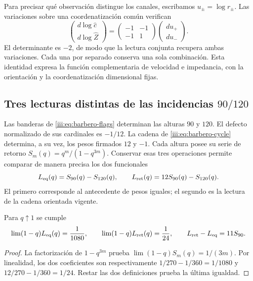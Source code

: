 Para precisar qué observación distingue los canales, escribamos
$u_\pm=\log r_\pm$. Las variaciones sobre una coordenatización común verifican
\begin{equation}
 \begin{pmatrix}d\log\widehat c\\d\log\widehat Z\end{pmatrix}
 =\begin{pmatrix}-1&-1\\-1&1\end{pmatrix}
 \begin{pmatrix}du_+\\du_-\end{pmatrix}.
 \label{iii:eq:rec27-variaciones}
\end{equation}
El determinante es $-2$, de modo que la lectura conjunta recupera
ambas variaciones. Cada una por separado conserva una sola combinación.
Esta identidad expresa la función complementaria de velocidad e
impedancia, con la orientación y la coordenatización dimensional fijas.

\subsection{Tres lecturas distintas de las incidencias $90/120$}

Las banderas de \eqref{iii:eq:barbero-flags} determinan las alturas
$90$ y $120$. El defecto normalizado de sus cardinales es $-1/12$.
La cadena de \eqref{iii:eq:barbero-cycle} determina, a su vez,
los pesos firmados $12$ y $-1$. Cada altura posee su serie de retorno
$S_m(q)=q^m/(1-q^{3m})$. Conservar esas tres operaciones permite
comparar de manera precisa los dos funcionales
\begin{equation}
 L_{\rm eq}(q)=S_{90}(q)-S_{120}(q),\qquad
 L_{\rm ret}(q)=12S_{90}(q)-S_{120}(q).
 \label{iii:eq:rec27-dos-kernels}
\end{equation}
El primero corresponde al antecedente de pesos iguales; el segundo es
la lectura de la cadena orientada vigente.

\begin{proposition}
Para $q\uparrow1$ se cumple
\begin{equation}
 \lim(1-q)L_{\rm eq}(q)=\frac1{1080},\qquad
 \lim(1-q)L_{\rm ret}(q)=\frac1{24},\qquad
 L_{\rm ret}-L_{\rm eq}=11S_{90}.
 \label{iii:eq:rec27-polos}
\end{equation}
\end{proposition}
\begin{proof}
La factorización de $1-q^{3m}$ prueba
$\lim(1-q)S_m(q)=1/(3m)$.
Por linealidad, los dos coeficientes son respectivamente
$1/270-1/360=1/1080$ y $12/270-1/360=1/24$.
Restar las dos definiciones prueba la última igualdad.
\end{proof}

